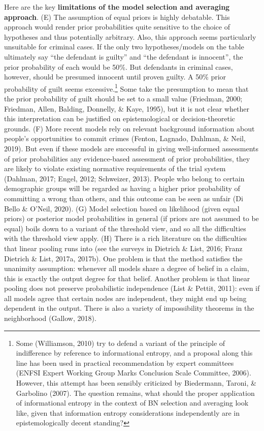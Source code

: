 \documentclass[11pt,dvipsnames,enabledeprecatedfontcommands]{scrartcl}
\begin{document}
Here are the key
\textbf{limitations of the model selection and averaging approach}. (E)
The assumption of equal priors is highly debatable. This approach would
render prior probabilities quite sensitive to the choice of hypotheses
and thus potentially arbitrary. Also, this approach seems particularly
unsuitable for criminal cases. If the only two hypotheses/models on the
table ultimately say ``the defendant is guilty'' and ``the defendant is
innocent'', the prior probability of each would be 50\%. But defendants
in criminal cases, however, should be presumed innocent until proven
guilty. A 50\% prior probability of guilt seems excessive.\footnote{Some
  (Williamson, 2010) try to defend a variant of the principle of
  indifference by reference to informational entropy, and a proposal
  along this line has been used in practical recommendation by expert
  committees (ENFSI Expert Working Group Marks Conclusion Scale
  Committee, 2006). However, this attempt has been sensibly criticized
  by Biedermann, Taroni, \& Garbolino (2007). The question remains, what
  should the proper application of informational entropy in the context
  of BN selection and averaging look like, given that information
  entropy considerations independently are in epistemologically decent
  standing?} Some take the presumption to mean that the prior
probability of guilt should be set to a small value (Friedman, 2000;
Friedman, Allen, Balding, Donnelly, \& Kaye, 1995), but it is not clear
whether this interpretation can be justified on epistemological or
decision-theoretic grounds. (F) More recent models rely on relevant
background information about people's opportunities to commit crimes
(Fenton, Lagnado, Dahlman, \& Neil, 2019). But even if these models are
successful in giving well-informed assessments of prior probabilities
any evidence-based assessment of prior probabilities, they are likely to
violate existing normative requirements of the trial system (Dahlman,
2017; Engel, 2012; Schweizer, 2013). People who belong to certain
demographic groups will be regarded as having a higher prior probability
of committing a wrong than others, and this outcome can be seen as
unfair (Di Bello \& O'Neil, 2020). (G) Model selection based on
likelihood (given equal priors) or posterior model probabilities in
general (if priors are not assumed to be equal) boils down to a variant
of the threshold view, and so all the difficulties with the threshold
view apply. (H) There is a rich literature on the difficulties that
linear pooling runs into (see the surveys in Dietrich \& List, 2016;
Franz Dietrich \& List, 2017a, 2017b). One problem is that the method
satisfies the unanimity assumption: whenever all models share a degree
of belief in a claim, this is exactly the output degree for that belief.
Another problem is that linear pooling does not preserve probabilistic
independence (List \& Pettit, 2011): even if all models agree that
certain nodes are independent, they might end up being dependent in the
output. There is also a variety of impossibility theorems in the
neighborhood (Gallow, 2018).
\end{document}
